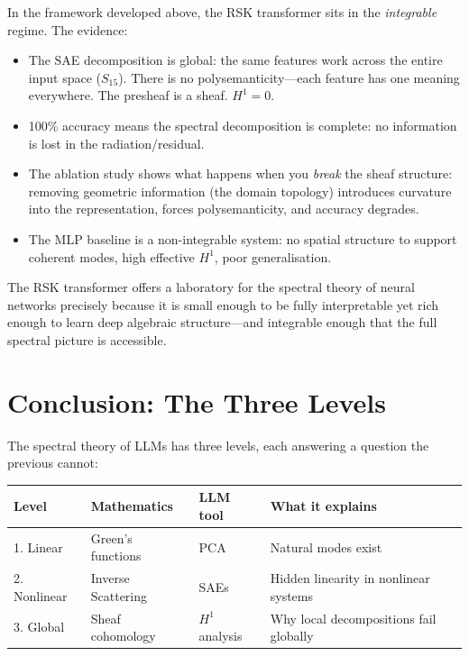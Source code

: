 \documentclass[11pt,a4paper]{article}
\begin{document}
In the framework developed above, the RSK transformer sits in the
\emph{integrable} regime. The evidence:
\begin{itemize}[leftmargin=*]
  \item The SAE decomposition is global: the same features work across the
    entire input space ($S_{15}$). There is no polysemanticity---each feature
    has one meaning everywhere. The presheaf is a sheaf. $H^1 = 0$.
  \item 100\% accuracy means the spectral decomposition is complete: no
    information is lost in the radiation/residual.
  \item The ablation study shows what happens when you \emph{break} the
    sheaf structure: removing geometric information (the domain topology)
    introduces curvature into the representation, forces polysemanticity,
    and accuracy degrades.
  \item The MLP baseline is a non-integrable system: no spatial structure
    to support coherent modes, high effective $H^1$, poor generalisation.
\end{itemize}

The RSK transformer offers a laboratory for the spectral theory of neural
networks precisely because it is small enough to be fully interpretable yet
rich enough to learn deep algebraic structure---and integrable enough that the
full spectral picture is accessible.

\section{Conclusion: The Three Levels}

The spectral theory of LLMs has three levels, each answering a question the
previous cannot:

\medskip
\begin{center}
\renewcommand{\arraystretch}{1.3}
\begin{tabular}{@{}llll@{}}
\toprule
\textbf{Level} & \textbf{Mathematics} & \textbf{LLM tool} & \textbf{What it explains} \\
\midrule
1. Linear & Green's functions & PCA & Natural modes exist \\
2. Nonlinear & Inverse Scattering & SAEs & Hidden linearity in nonlinear systems \\
3. Global & Sheaf cohomology & $H^1$ analysis & Why local decompositions fail globally \\
\bottomrule
\end{tabular}
\end{center}
\end{document}
